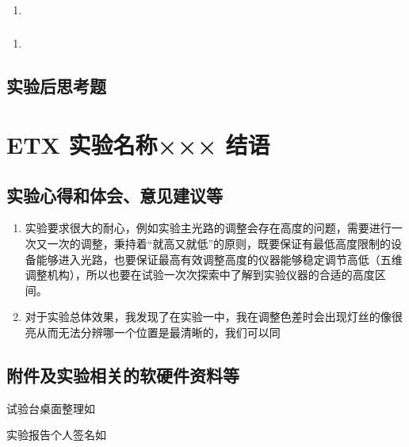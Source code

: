 \documentclass[dvipsnames, svgnames,a4paper,11pt]{article}
\begin{document}
	\subsubsection{}
	\begin{enumerate}
		\item 
	\end{enumerate}
	
	\subsubsection{}
	\begin{enumerate}
		\item 
	\end{enumerate}
	
	\subsubsection{}
	
	
	\subsection{实验后思考题}
	
	\begin{question}
		
	\end{question}
	
	\begin{question}
		
	\end{question}
	
	\begin{question}
		
	\end{question}
	
	
	
	\clearpage
	
	\section{ETX 实验名称××× \quad\heiti 结语}
	
	\subsection{实验心得和体会、意见建议等}
	\begin{enumerate}
		\item 实验要求很大的耐心，例如实验主光路的调整会存在高度的问题，需要进行一次又一次的调整，秉持着“就高又就低”的原则，既要保证有最低高度限制的设备能够进入光路，也要保证最高有效调整高度的仪器能够稳定调节高低（五维调整机构），所以也要在试验一次次探索中了解到实验仪器的合适的高度区间。
		\item 对于实验总体效果，我发现了在实验一中，我在调整色差时会出现灯丝的像很亮从而无法分辨哪一个位置是最清晰的，我们可以同 
	\end{enumerate}
	

	\subsection{附件及实验相关的软硬件资料等}
	试验台桌面整理如%
	
	实验报告个人签名如

	
	
\end{document}
